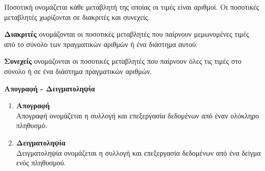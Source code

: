 \documentclass[twoside,nofonts,internet,math,spyros]{frontisthrio}
\begin{document}
\begin{arithmisi}
\begin{enumerate}[label=\bf\arabic*.]
Ποσοτική ονομάζεται κάθε μεταβλητή της οποίας οι τιμές είναι αριθμοί. Οι ποσοτικές μεταβλητές χωρίζονται σε διακριτές και συνεχείς.
\begin{rlist}
\item \textbf{Διακριτές} ονομάζονται οι ποσοτικές μεταβλητές που παίρνουν μεμωνομένες τιμές από το σύνολο των πραγματικών αριθμών ή ένα διάστημα αυτού.
\item \textbf{Συνεχείς} ονομάζονται οι ποσοτικές μεταβλητές που παίρνουν όλες τις τιμές στο σύνολο ή σε ένα διάστημα πραγματικών αριθμών.
\end{rlist}
\end{enumerate}
\item\textbf{Απογραφή - Δειγματοληψία}\\
\vspace{-5mm}
\begin{enumerate}[label=\bf\arabic*.,itemsep=0mm]
\item \textbf{Απογραφή}\\
Απογραφή ονομάζεται η συλλογή και επεξεργασία δεδομένων από έναν ολόκληρο πληθυσμό.
\item \textbf{Δειγματοληψία}\\
Δειγματοληψία ονομάζεται η συλλογή και επεξεργασία δεδομένων από ένα δείγμα ενός πληθυσμού.
\end{enumerate}
\end{arithmisi}
\newpage
\end{document}
